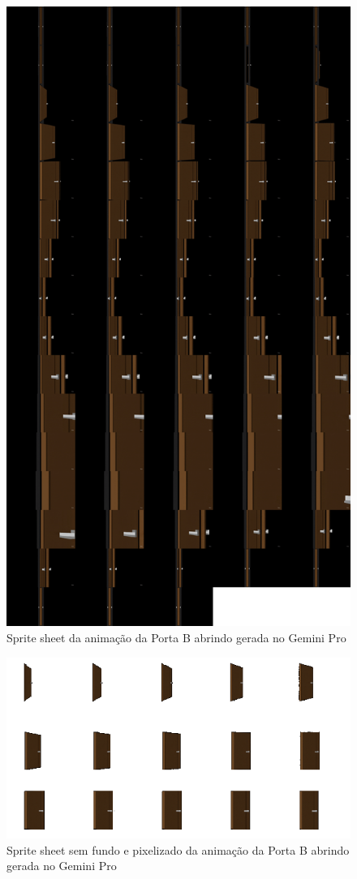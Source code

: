 \begin{figure}[htbp]
    \centering
    \caption{\small Sprite sheet da animação da Porta B abrindo gerada no Gemini Pro}
    \label{fig:geminiProPortaBSpriteSheet}
    \includegraphics[width=0.7\linewidth]{figs/geminiPro/sprite sheet/side_door_sprite_sheet.png}
\end{figure}

\begin{figure}[htbp]
    \centering
    \caption{\small Sprite sheet sem fundo e pixelizado da animação da Porta B abrindo gerada no Gemini Pro}
    \label{fig:geminiProPortaBSpriteSheetPixel}
    \includegraphics[width=1\linewidth]{figs/geminiPro/sprite sheet/side_door_pixel.png}
\end{figure}

